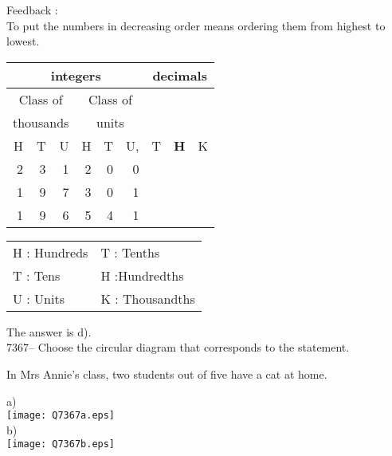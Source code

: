 \documentclass[letterpaper, 12pt]{article}
\begin{document}
Feedback :\\
To put the numbers in decreasing order means ordering them from highest to lowest.\\
\begin{center}
\begin{tabular}{|rrr|rrr|rrr|}
\hline
\multicolumn{6}{|c|}{integers} &\multicolumn{3}{|c|}{decimals} \\
\hline
\multicolumn{3}{|c|}{Class of} &\multicolumn{3}{|c|}{Class of} &  \multicolumn{3}{c|}{} \\
\multicolumn{3}{|c|}{thousands} &\multicolumn{3}{|c|}{units} &  \multicolumn{3}{c|}{} \\
\hline
H & T & U &H & T & U, & T\up{th} & \textbf{H\up{th}} & K\up{th} \\
\hline
\hline
 2& 3 & 1 & 2 & 0 & 0 & & &\\
 1& 9 & 7 & 3 & 0 & 1 & & &\\
 1& 9 & 6 & 5 & 4 & 1 & & &\\
\hline
\end{tabular}
\end{center}

\scriptsize
\begin{center}
\begin{tabular}{ll}
H : Hundreds & T\up{th} : Tenths\\
T : Tens & H\up{th} :Hundredths\\
U : Units & K\up{e} : Thousandths\\
\end{tabular}
\end{center}

\normalsize
The answer is d).\\


7367-- Choose the circular diagram that corresponds to the statement.\\ 
\begin{center}
In Mrs Annie's class, two students out of five have a cat at home.\\
\end{center}

a)\\
\texttt{[image: Q7367a.eps]}
\\

b)\\
\texttt{[image: Q7367b.eps]}
\\
\end{document}
